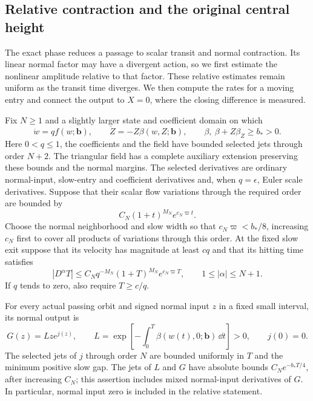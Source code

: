 \subsection{Relative contraction and the original central height}

The exact phase reduces a passage to scalar transit and normal
contraction.  Its linear normal factor may have a divergent action,
so we first estimate the nonlinear amplitude relative to that factor.
These relative estimates remain uniform as the transit time diverges.
We then compute the rates for a moving entry and connect the output
to $X=0$, where the closing difference is measured.

\begin{proposition}\label{rw:relative-core}
Fix $N\ge1$ and a slightly larger state and coefficient domain on which
\begin{equation}\label{rw:relative:field}
 \dot w=q f(w;\mathbf b),\qquad
 \dot Z=-Z\beta(w,Z;\mathbf b),\qquad
 \beta,\ \beta+Z\beta_Z\ge b_*>0.
\end{equation}
Here $0<q\le1$, the coefficients and the field have bounded selected
jets through order $N+2$. The triangular field has a complete auxiliary
extension preserving these bounds and the normal margins.
The selected derivatives are ordinary normal-input, slow-entry and
coefficient derivatives and, when $q=\epsilon$, Euler scale derivatives.
Suppose that their scalar flow variations through the required order
are bounded by
\begin{equation}\label{rw:relative:slow-growth}
 C_N(1+t)^{M_N}e^{c_N\varpi t}.
\end{equation}
Choose the normal neighborhood and slow width so that
$c_N\varpi<b_*/8$, increasing $c_N$ first to cover all products of
variations through this order. At the fixed slow exit suppose that its
velocity has magnitude at least $cq$ and that its hitting time satisfies
\begin{equation}\label{rw:relative:time-jets}
 |D^\alpha T|\le C_Nq^{-M_N}(1+T)^{M_N}e^{c_N\varpi T},
 \qquad 1\le|\alpha|\le N+1.
\end{equation}
If $q$ tends to zero, also require $T\ge c/q$.

For every actual passing orbit and signed normal input $z$ in a fixed
small interval, its normal output is
\begin{equation}\label{rw:relative:output}
 G(z)=Lz e^{j(z)},\qquad
 L=\exp\left[-\int_0^T\beta(w(t),0;\mathbf b)\,\dd t\right]>0,
 \qquad j(0)=0.
\end{equation}
The selected jets of $j$ through order $N$ are bounded uniformly in
$T$ and the minimum positive slow gap. The jets of $L$ and $G$ have
absolute bounds $C_Ne^{-b_*T/4}$, after increasing $C_N$; this assertion
includes mixed normal-input derivatives of $G$. In particular, normal
input zero is included in the relative statement.


\end{proposition}
